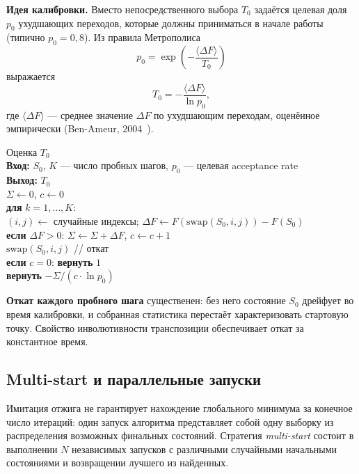 \textbf{Идея калибровки.} Вместо непосредственного выбора $T_0$
задаётся целевая доля $p_0$ ухудшающих переходов, которые должны
приниматься в начале работы (типично $p_0 = 0{,}8$). Из правила
Метрополиса
\[
    p_0 = \exp\!\left(-\frac{\langle\Delta F\rangle}{T_0}\right)
\]
выражается
\begin{equation}
\label{eq:t0}
    T_0 = -\frac{\langle\Delta F\rangle}{\ln p_0},
\end{equation}
где $\langle\Delta F\rangle$ — среднее значение $\Delta F$ по
ухудшающим переходам, оценённое эмпирически (Ben-Ameur, 2004~\cite{benameur2004t0}).

\begin{algorithm}{Оценка $T_0$}\hfill\\
\textbf{Вход:} $S_0$, $K$ — число пробных шагов, $p_0$ — целевая acceptance rate \\
\textbf{Выход:} $T_0$ \\[2pt]
$\Sigma \leftarrow 0$, $c \leftarrow 0$ \\
\textbf{для} $k = 1, \dots, K$: \\
\quad $(i, j) \leftarrow$ случайные индексы; $\Delta F \leftarrow F(\mathrm{swap}(S_0, i, j)) - F(S_0)$ \\
\quad \textbf{если} $\Delta F > 0$: $\Sigma \leftarrow \Sigma + \Delta F$, $c \leftarrow c + 1$ \\
\quad $\mathrm{swap}(S_0, i, j)$ \quad // откат \\
\textbf{если} $c = 0$: \textbf{вернуть} $1$ \\
\textbf{вернуть} $-\Sigma / (c \cdot \ln p_0)$
\end{algorithm}

\textbf{Откат каждого пробного шага} существенен: без него
состояние $S_0$ дрейфует во время калибровки, и собранная
статистика перестаёт характеризовать стартовую точку. Свойство
инволютивности транспозиции обеспечивает откат за константное
время.

\subsection{Multi-start и параллельные запуски}

Имитация отжига не гарантирует нахождение глобального минимума
за конечное число итераций: один запуск алгоритма представляет
собой одну выборку из распределения возможных финальных
состояний. Стратегия \emph{multi-start} состоит в выполнении $N$
независимых запусков с различными случайными начальными
состояниями и возвращении лучшего из найденных.

